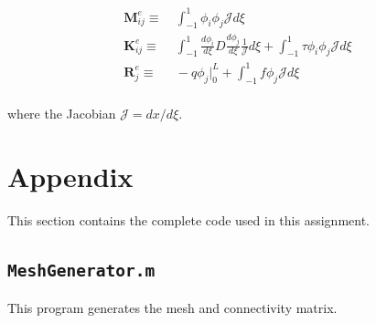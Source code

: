 \documentclass[10pt]{article}
\begin{document}
\begin{equation}
\label{eq:FEWeakForm_element2}
\begin{aligned}
\textbf{M}^e_{ij}\equiv&\ \int_{-1}^{1}\phi_i\phi_j\mathscr{J}d\xi\\
\textbf{K}_{ij}^e\equiv&\ \int_{-1}^{1}\frac{d\phi_i}{d\xi}D\frac{d\phi_j}{d\xi}\frac{1}{\mathscr{J}}d\xi+\int_{-1}^{1}\tau \phi_i\phi_j \mathscr{J}d\xi\\
\textbf{R}_{j}^e\equiv&\ -q\phi_j\biggr\rvert_{0}^{L}+\int_{-1}^{1}f\phi_j\mathscr{J}d\xi\\
\end{aligned}
\end{equation}

where the Jacobian \(\mathscr{J}=dx/d\xi\). 


\section{Appendix}

This section contains the complete code used in this assignment. 

\subsection{\texttt{MeshGenerator.m}}
This program generates the mesh and connectivity matrix.

\end{document}
